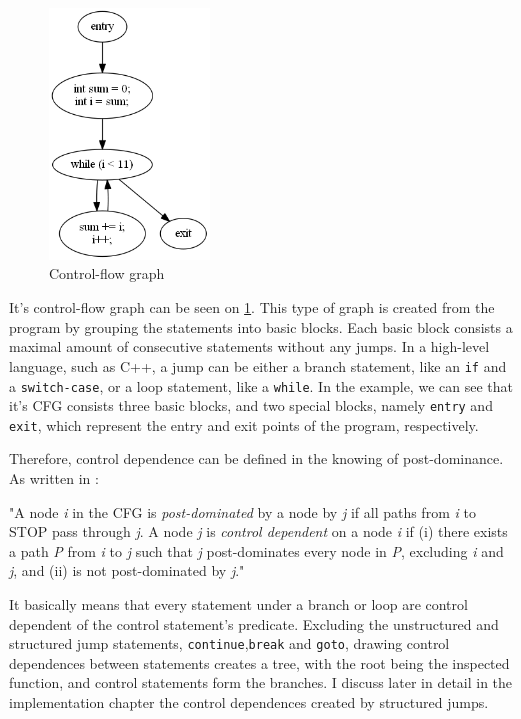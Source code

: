 \documentclass[oneside,12pt,a4paper]{book}
\begin{document}
\begin{figure}
  \centering
    \includegraphics[width=0.38\textwidth]{horwitz_cfg.png}
  \caption{Control-flow graph}
  \label{fig:horwitz_cfg}
\end{figure}

It's control-flow graph can be seen on \ref{fig:horwitz_cfg}. This type of graph is created from the program by grouping the statements into basic blocks. Each basic block consists a maximal amount of consecutive statements without any jumps. In a high-level language, such as C++, a jump can be either a branch statement, like an \texttt{if} and a \texttt{switch-case}, or a loop statement, like a \texttt{while}. In the example, we can see that it's CFG consists three basic blocks, and two special blocks, namely \texttt{entry} and \texttt{exit}, which represent the entry and exit points of the program, respectively.

Therefore, control dependence can be defined in the knowing of post-dominance. As written in \cite{slicing-survey}:

"A node \textit{i} in the CFG is \textit{post-dominated} by a node by \textit{j} if all paths from \textit{i} to STOP pass through \textit{j}. A node \textit{j} is \textit{control dependent} on a node \textit{i} if (i) there exists a path \textit{P} from \textit{i} to \textit{j} such that \textit{j} post-dominates every node in \textit{P}, excluding \textit{i} and \textit{j}, and (ii) is not post-dominated by \textit{j}."

It basically means that every statement under a branch or loop are control dependent of the control statement's predicate. Excluding the unstructured and structured jump statements, \texttt{continue},\texttt{break} and \texttt{goto}, drawing control dependences between statements creates a tree, with the root being the inspected function, and control statements form the branches. I discuss later in detail in the implementation chapter the control dependences created by structured jumps. 
\end{document}
